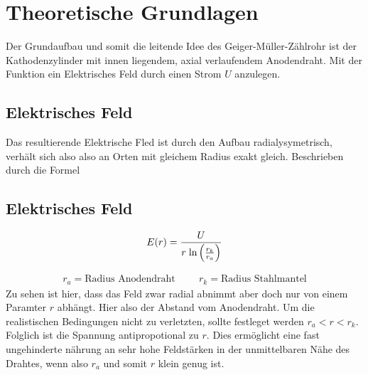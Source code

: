 \section{Theoretische Grundlagen}

Der Grundaufbau und somit die leitende Idee des Geiger-Müller-Zählrohr ist der Kathodenzylinder %
mit innen liegendem, axial verlaufendem Anodendraht. Mit der Funktion ein Elektrisches Feld durch einen Strom $U$ anzulegen.

\subsection{Elektrisches Feld}

Das resultierende Elektrische Fled ist durch den Aufbau radialysymetrisch, verhält sich also also an Orten mit gleichem Radius exakt gleich.
Beschrieben durch die Formel 

\subsection{Elektrisches Feld} %
\begin{equation}  %
\label{eqn:efeld}
E(r) = \frac{U}{r \hspace{0.1cm} \text{ln} \left( \frac{r_k}{r_a} \right) }
\end{equation}

\begin{align}
r_a = \text{Radius Anodendraht}     \hspace{1cm} r_k = \text{Radius Stahlmantel}
\end{align}
Zu sehen ist hier, dass das Feld zwar radial abnimmt aber doch nur von einem Paramter $r$ abhängt. Hier also der Abstand vom Anodendraht.
Um die realistischen Bedingungen nicht zu verletzten, sollte festleget werden $r_a<r<r_k$.
Folglich ist die Spannung antipropotional zu $r$. Dies ermöglicht eine fast ungehinderte nährung an sehr hohe Feldstärken in der unmittelbaren Nähe des Drahtes, wenn also $r_a$ und somit $r$ klein genug ist. 

